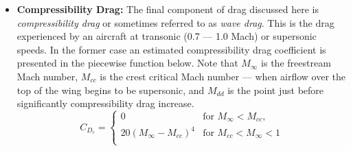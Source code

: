 \documentclass{report}
\begin{document}
\begin{itemize}
\begin{itemize}
\begin{itemize}
                    \begin{equation}
                    k = 1 + Z \frac{t}{c} + 100{\left(\frac{t}{c}\right)}^4                    
                    \end{equation}
                    with
                    \begin{equation}
                    Z = \frac{\left(2-M_{\infty}^2\right)\cos{\Lambda}}{\sqrt{1-M_{\infty}^2\cos^2{\Lambda}}}
                    \end{equation}
                    
                    Here, $\Lambda$ represents the quarter-chord sweep angle. 




                \end{itemize}
            
            Combining both skin friction and pressure drag we get a formula for total parasitic drag:
            \begin{equation}
            D_p = kC_f q_{\infty}S_{wet}
            \end{equation}
            Where $S_{wet} \approx 2\left(1 + 0.2 \frac{t}{c}\right)S_{exposed}$ of the lifting surface. Finally, in order to normalize this total parasitic drag, the following coefficient is computed:
            \begin{equation}
            C_{D_p} = k C_f \frac{S_{wet}}{S_{ref}}
            \end{equation}
            

            \item \textbf{Compressibility Drag:} The final component of drag discussed here is \textit{compressibility drag} or sometimes referred to as \textit{wave drag}. This is the drag
            experienced by an aircraft at transonic (0.7 --- 1.0 Mach) or supersonic speeds. In the former case an estimated compressibility drag coefficient is presented in the piecewise function below. Note that
            $M_{\infty}$ is the freestream Mach number, $M_{cc}$ is the crest critical Mach number --- when airflow over the top of the wing begins to be supersonic, and $M_{dd}$ is the point just before significantly
            compressibility drag increase.
            \begin{equation}
            C_{D_c} = \begin{cases}
            0 & \text{for } M_{\infty} <  M_{cc},\\
            20{(M_{\infty} - M_{cc})}^4  & \text{for } M_{cc} < M_{\infty} < 1\\
            \end{cases}
            \end{equation}


\end{itemize}
\end{itemize}
\end{document}
